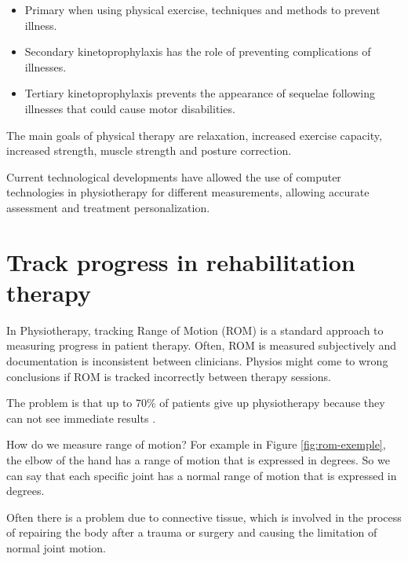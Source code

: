 \begin{itemize}
  \item Primary when using physical exercise, techniques and methods to prevent illness.
  \item Secondary kinetoprophylaxis has the role of preventing complications of illnesses.
  \item Tertiary kinetoprophylaxis prevents the appearance of sequelae following illnesses that could cause motor disabilities.
\end{itemize}


The main goals of physical therapy are relaxation, increased exercise capacity, 
increased strength, muscle strength and posture correction.

Current technological developments have allowed the use of computer technologies in physiotherapy
 for different measurements, allowing accurate assessment and treatment personalization.
\section{Track progress in rehabilitation therapy}


\par In Physiotherapy, tracking Range of Motion (ROM) is a standard approach to measuring progress in patient therapy. 
Often, ROM is measured subjectively and documentation is inconsistent between clinicians. 
Physios might come to wrong conclusions if ROM is tracked incorrectly between therapy sessions.


\par The problem is that up to 70\% of patients give up physiotherapy because they can not see 
immediate results \cite{7FactsInPhysicalTherapy}.

How do we measure range of motion? For example in Figure \ref{fig:rom-exemple}, 
the elbow of the hand has a range of motion that is expressed in degrees.
So we can say that each specific joint has a normal range of motion 
that is expressed in degrees.

Often there is a problem due to connective tissue, which is involved in 
the process of repairing the body
after a trauma or surgery and causing the limitation of normal joint motion.

